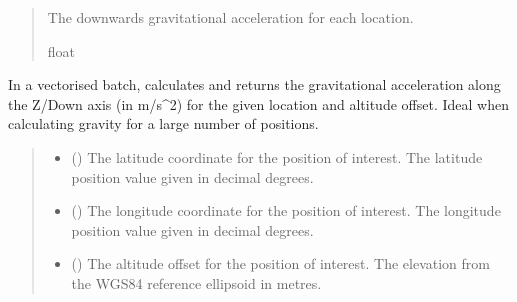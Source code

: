 \documentclass[letterpaper,10pt,english]{sphinxmanual}
\begin{document}
\begin{fulllineitems}
\begin{fulllineitems}
\begin{quote}
\begin{description}
\sphinxAtStartPar
The downwards gravitational acceleration for each location.

\sphinxAtStartPar
float

\end{description}\end{quote}

\end{fulllineitems}


\begin{fulllineitems}
\label{\detokenize{modules/gravity/ggm_plus:qnav.gravity.ggm_plus.GGMPlusDist.calc_gravity_z_vec}}
\pysigstartsignatures
{}
\pysigstopsignatures
\sphinxAtStartPar
In a vectorised batch, calculates and returns the gravitational
acceleration along the Z/Down axis (in m/s\textasciicircum{}2) for the given location
and altitude offset. Ideal when calculating gravity for a large
number of positions.
\begin{quote}\begin{description}
\begin{itemize}
\item {} 
\sphinxAtStartPar
{} () \textendash{} The latitude coordinate for the position of interest.
The latitude position value given in decimal degrees.

\item {} 
\sphinxAtStartPar
{} () \textendash{} The longitude coordinate for the position of interest.
The longitude position value given in decimal degrees.

\item {} 
\sphinxAtStartPar
{} () \textendash{} The altitude offset for the position of interest.
The elevation from the WGS\sphinxhyphen{}84 reference ellipsoid in metres.


\end{itemize}
\end{description}
\end{quote}
\end{fulllineitems}
\end{fulllineitems}
\end{document}
